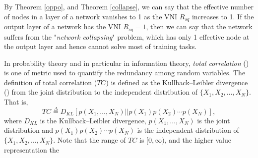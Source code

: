 By Theorem \ref{oppo}, and Theorem \ref{collapse}, we can say that the effective number of nodes
in a layer of a network vanishes to 1 as the VNI $R_{sq}$ increases to 1.
If the output layer
of a network has the VNI $R_{sq}=1$, then we can say that the network suffers from the
"\textit{network collapsing}" problem, which has only 1 effective node at the output layer and
hence cannot solve most of training tasks.

\iffalse
In probability theory and in particular in information theory, \textit{total correlation}
(\cite{total_corr}) is one of metric used to quantify the redundancy among random variables.
The definition of total correlation ($TC$) is defined as the Kullback–Leibler divergence (\cite{KL_div})
from the joint distribution to the independent distribution of $\{X_1, X_2, \dots, X_N\}$. That is,
\begin{equation}
    TC\overset{\Delta}{=}D_{KL}[p(X_1, \dots, X_N)||p(X_1)p(X_2)\cdots p(X_N)],
    \label{def_total_corr}
\end{equation}
where $D_{KL}$ is the Kullback–Leibler divergence, $p(X_1, \dots, X_N)$ is the joint distribution and
$p(X_1)p(X_2)\cdots p(X_N)$ is the independent distribution of $\{X_1, X_2, \dots, X_N\}$.
Note that the range of $TC$ is $[0,\infty)$, and the higher value representation the 

